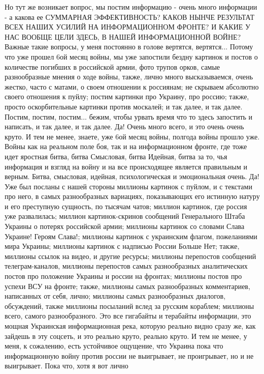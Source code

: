 Но тут же возникает вопрос, мы постим информацию - очень много информации - а
какова ее СУММАРНАЯ ЭФФЕКТИВНОСТЬ? КАКОВ НЫНЧЕ РЕЗУЛЬТАТ ВСЕХ НАШИХ УСИЛИЙ НА
ИНФОРМАЦИОННОМ ФРОНТЕ? И КАКИЕ У НАС ВООБЩЕ ЦЕЛИ ЗДЕСЬ, В НАШЕЙ ИНФОРМАЦИОННОЙ
ВОЙНЕ?  Важные такие вопросы, у меня постоянно в голове вертятся, вертятся...
Потому что уже прошел 6ой месяц войны, мы уже запостили бездну картинок и
постов о количестве погибших в российской армии, фото трупов орков, самые
разнообразные мнения о ходе войны, также, лично много высказываемся, очень
жестко, часто с матами, о своем отношении к россиянам; не скрываем абсолютно
своего отношения к пуйлу; постим картинки про Украину, про россию; также,
просто оскорбительные картинки против москалей; и так далее, и так далее.
Постим, постим, постим... бежим, чтобы урвать время что то здесь запостить и
написать, и так далее, и так далее.  Да!  Очень много всего, и это очень очень
круто. И тем не менее, знаете, уже 6ой месяц войны, полгода войны прошло уже.
Войны как на реальном поле боя, так и на
информационном фронте, где тоже идет яростная битва, битва Смысловая, битва
Идейная, битва за то, чья информация и взгляд на войну и на все происходящее
является правильным и верным. Битва, смысловая, идейная, психологическая и
эмоциональная очень.  Да!  Уже был посланы с нашей стороны миллионы картинок с
пуйлом, и с текстами про него, в самых разнообразных вариациях, показывающих
его истинную натуру и его преступную сущность, по тысячам чатов; миллион
картинок, где россия уже развалилась; миллион картинок-скринов сообщений
Генерального Штаба Украины о потерях российской армии; миллионы картинок со
словами Слава Украине! Героям Слава!; миллионы картинок с украинским флагом,
пожеланиями мира Украины; миллионы картинок с надписью России Больше Нет;
также, миллионы ссылок на видео, и другие ресурсы; миллионы перепостов
сообщений телеграм-каналов, миллионы перепостов самых разнообразных
аналитических постов про положение Украины и россии на фронтах; миллионы постов
про успехи ВСУ на фронте; также, миллионы самых разнообразных комментариев,
написанных от себя, лично; миллионы самых разнообразных диалогов, обсуждений,
также миллионы посыланий вслед за русским кораблем; миллионы всего, самого
разнообразного. Это все гигабайты и терабайты информации, это мощная Украинская
информационная река, которую реально видно сразу же, как зайдешь в эту соцсеть,
и это реально круто, реально круто. И тем не менее, у меня, к сожалению, есть
устойчивое ощущение, что Украина пока что информационную войну против россии не
выигрывает, не проигрывает, но и не выигрывает. Пока что, хотя я вот лично
